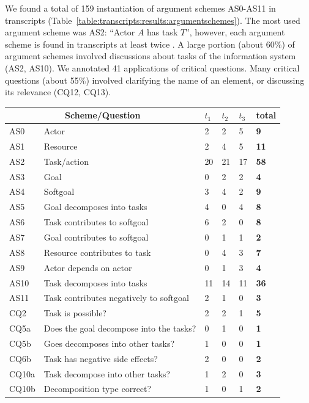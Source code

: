 We found a total of 159 instantiation of argument schemes AS0-AS11 in transcripts (Table~\ref{table:transcripts:results:argumentschemes}). The most used argument scheme was AS2: ``Actor $A$ has task $T$'', however, each argument scheme is found in transcripts at least twice . A large portion (about 60\%) of argument schemes involved discussions about tasks of the information system (AS2, AS10). We annotated 41 applications of critical questions. Many critical questions (about 55\%) involved clarifying the name of an element, or discussing its relevance (CQ12, CQ13).

\begin{table}[ht]
\centering
\begin{tabularx}{0.5\textwidth}{|l|X|l|l|l|>{\bfseries}l|}
\hline
\multicolumn{2}{|c|}{\textbf{Scheme/Question}} & $t_1$ & $t_2$ & $t_3$ & \textbf{total}\\
\hline 
AS0 & Actor & 2 & 2 & 5 & 9\\
\hline
AS1 & Resource & 2 & 4 & 5 & 11\\
\hline
AS2 & Task/action & 20 & 21 & 17 & 58\\
\hline
AS3 & Goal & 0 & 2 & 2 & 4\\
\hline
AS4 & Softgoal & 3 & 4 & 2 & 9\\
\hline
AS5 & Goal decomposes into tasks & 4 &0& 4 & 8\\
\hline
AS6 & Task contributes to softgoal & 6 & 2 &0& 8\\
\hline
AS7 & Goal contributes to softgoal &0& 1 & 1 & 2\\
\hline
AS8 & Resource contributes to task & 0 & 4 & 3 & 7\\
\hline
AS9 & Actor depends on actor &0& 1 & 3 & 4\\
\hline
AS10 & Task decomposes into tasks & 11 &14 &11 &36\\ 
\hline
AS11 & Task contributes negatively to softgoal & 2 & 1 & 0 & 3\\
\hline
\hline
CQ2 & Task is possible? & 2 & 2 & 1 & 5\\
\hline		
CQ5a & Does the goal decompose into the tasks? & 0 & 1 & 0 & 1\\
\hline
CQ5b & Goes decomposes into other tasks? & 1 & 0 & 0 & 1\\
\hline
CQ6b & Task has negative side effects? & 2 & 0 & 0 & 2\\
\hline
CQ10a & Task decompose into other tasks? & 1 &2 &0&3\\
\hline
CQ10b & Decomposition type correct? &1 &0& 1 &2\\

\end{tabularx}
\end{table}
